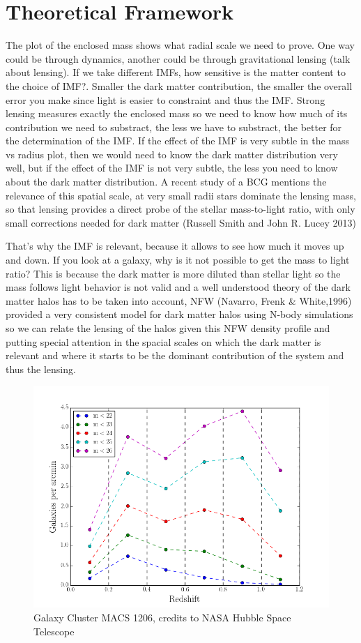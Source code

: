 \chapter{Theoretical Framework}


The plot of the enclosed mass shows what radial scale we need to prove. One way could be through dynamics, another could be through gravitational lensing (talk about lensing). If we take different IMFs, how sensitive is the matter content to the choice of IMF?. Smaller the dark matter contribution, the smaller the overall error you make since light is easier to constraint and thus the IMF. Strong lensing measures exactly the enclosed mass so we need to know how much of its contribution we need to substract, the less we have to substract, the better for the determination of the IMF. If the effect of the IMF is very subtle in the mass vs radius plot, then we would need to know the dark matter distribution very well, but if the effect of the IMF is not very subtle, the less you need to know about the dark matter distribution. A recent study of a BCG mentions the relevance of this spatial scale, at very small radii stars dominate the lensing mass, so that lensing provides a direct probe of the stellar mass-to-light ratio, with only small corrections needed for dark matter (Russell Smith and John R. Lucey 2013) 

That's why the IMF is relevant, because it allows to see how much it moves up and down. If you look at a galaxy, why is it not possible to get the mass to light ratio? This is because the dark matter is more diluted than stellar light so the mass follows light behavior is not valid and a well understood theory of the dark matter halos has to be taken into account, NFW (Navarro, Frenk \& White,1996) provided a very consistent model for dark matter halos using N-body simulations so we can relate the lensing of the halos given this NFW density profile and putting special attention in the spacial scales on which the dark matter is relevant and where it starts to be the dominant contribution of the system and thus the lensing.

\begin{figure}[H]
\centering
\includegraphics[width=12cm]{images/galaxies_per_arcmin.png}
\caption[Galaxy Cluster MACS 1206]{Galaxy Cluster MACS 1206, credits to NASA Hubble Space Telescope}
\end{figure}


